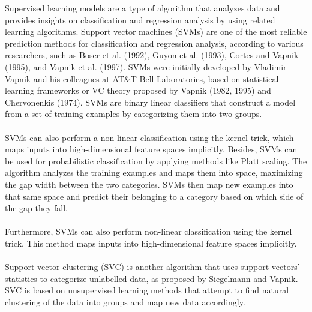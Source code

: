 Supervised learning models are a type of algorithm that analyzes data and provides insights on classification and 
regression analysis by using related learning algorithms. Support vector machines (SVMs) are one of the most 
reliable prediction methods for classification and regression analysis, according to various researchers, such as 
Boser et al. (1992), Guyon et al. (1993), Cortes and Vapnik (1995), and Vapnik et al. (1997). SVMs were initially 
developed by Vladimir Vapnik and his colleagues at AT\&T Bell Laboratories, based on statistical learning frameworks 
or VC theory proposed by Vapnik (1982, 1995) and Chervonenkis (1974). SVMs are binary linear classifiers that 
construct a model from a set of training examples by categorizing them into two groups.\\\\
SVMs can also perform a non-linear classification using the kernel trick, which maps inputs into high-dimensional 
feature spaces implicitly. Besides, SVMs can be used for probabilistic classification by applying methods like 
Platt scaling. The algorithm analyzes the training examples and maps them into space, maximizing the gap width 
between the two categories. SVMs then map new examples into that same space and predict their belonging to a 
category based on which side of the gap they fall.\\\\
Furthermore, SVMs can also perform non-linear classification using the kernel trick. This method maps inputs 
into high-dimensional feature spaces implicitly.\\\\
Support vector clustering (SVC) is another algorithm that uses support vectors' statistics to categorize unlabelled 
data, as proposed by Siegelmann and Vapnik. SVC is based on unsupervised learning methods that attempt to find 
natural clustering of the data into groups and map new data accordingly.
